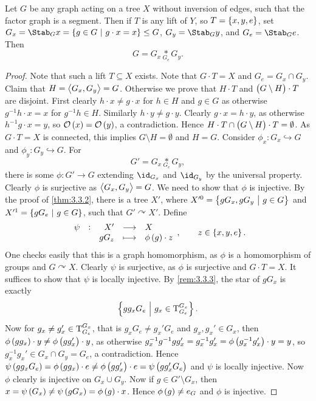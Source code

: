 \pagebreak

\begin{theorem}
\label{thm:3.4}
Let $ G $ be any graph acting on a tree $ X $ without inversion of edges, such that the factor graph is a segment. Then if $ T $ is any lift of $ Y $, so $ T = \cbr{x, y, e} $, set $ G_x = \Stab_G x = \cbr{g \in G \st g \cdot x = x} \le G $, $ G_y = \Stab_G y $, and $ G_e = \Stab_G e $. Then
$$ G = G_x \underset{G_e}{*} G_y. $$
\end{theorem}

\begin{proof}
Note that such a lift $ T \subseteq X $ exists. Note that $ G \cdot T = X $ and $ G_e = G_x \cap G_y $. Claim that $ H = \left\langle G_x, G_y \right\rangle = G $. Otherwise we prove that $ H \cdot T $ and $ \br{G \setminus H} \cdot T $ are disjoint. First clearly $ h \cdot x \ne g \cdot x $ for $ h \in H $ and $ g \in G $ as otherwise $ g^{-1}h \cdot x = x $ for $ g^{-1}h \in H $. Similarly $ h \cdot y \ne g \cdot y $. Clearly $ g \cdot x = h \cdot y $, as otherwise $ h^{-1}g \cdot x = y $, so $ \OOO\br{x} = \OOO\br{y} $, a contradiction. Hence $ H \cdot T \cap \br{G \setminus H} \cdot T = \emptyset $. As $ G \cdot T = X $ is connected, this implies $ G \setminus H = \emptyset $ and $ H = G $. Consider $ \phi_x : G_x \hookrightarrow G $ and $ \phi_y : G_y \hookrightarrow G $. For
$$ G' = G_x \underset{G_e}{*} G_y, $$
there is some $ \phi : G' \to G $ extending $ \id_{G_x} $ and $ \id_{G_y} $ by the universal property. Clearly $ \phi $ is surjective as $ \left\langle G_x, G_y \right\rangle = G $. We need to show that $ \phi $ is injective. By the proof of \ref{thm:3.3.2}, there is a tree $ X' $, where $ X'^0 = \cbr{gG_x, gG_y \st g \in G} $ and $ X'^1 = \cbr{gG_e \st g \in G} $, such that $ G' \curvearrowright X' $. Define
$$ \function[\psi]{X'}{X}{gG_z}{\phi\br{g} \cdot z}, \qquad z \in \cbr{x, y, e}. $$
One checks easily that this is a graph homomorphism, as $ \phi $ is a homomorphism of groups and $ G \curvearrowright X $. Clearly $ \psi $ is surjective, as $ \phi $ is surjective and $ G \cdot T = X $. It suffices to show that $ \psi $ is locally injective. By \ref{rem:3.3.3}, the star of $ gG_x $ is exactly
$$ \cbr{gg_xG_e \st g_x \in \T_{G_e}^{G_x}}. $$
Now for $ g_x \ne g_x' \in \mathrm{T}_{G_e}^{G_x} $, that is $ g_xG_e \ne g_x'G_e $ and $ g_x, g_x' \in G_x $, then $ \phi\br{gg_x} \cdot y \ne \phi\br{gg_x'} \cdot y $, as otherwise $ g_x^{-1}g^{-1}gg_x' = g_x^{-1}g_x' = \phi\br{g_x^{-1}g_x'} \cdot y = y $, so $ g_x^{-1}g_x' \in G_x \cap G_y = G_e $, a contradiction. Hence $ \psi\br{gg_xG_e} = \phi\br{gg_x} \cdot e \ne \phi\br{gg_x'} \cdot e = \psi\br{gg_x'G_e} $ and $ \psi $ is locally injective. Now $ \phi $ clearly is injective on $ G_x \cup G_y $. Now if $ g \in G' \setminus G_x $, then $ x = \psi\br{G_x} \ne \psi\br{gG_x} = \phi\br{g} \cdot x $. Hence $ \phi\br{g} \ne e_G $ and $ \phi $ is injective.
\end{proof}

